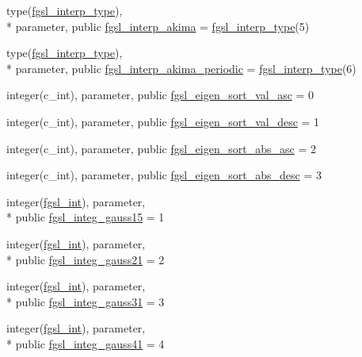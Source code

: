 \begin{DoxyCompactItemize}
\item 
type(\hyperlink{structfgsl_1_1fgsl__interp__type}{fgsl\-\_\-interp\-\_\-type}), \\*
parameter, public \hyperlink{classfgsl_a7da81682e22860ff3f743dcf2e80b6e5}{fgsl\-\_\-interp\-\_\-akima} = \hyperlink{structfgsl_1_1fgsl__interp__type}{fgsl\-\_\-interp\-\_\-type}(5)
\item 
type(\hyperlink{structfgsl_1_1fgsl__interp__type}{fgsl\-\_\-interp\-\_\-type}), \\*
parameter, public \hyperlink{classfgsl_ae51f422b992227f64fb8505b62335502}{fgsl\-\_\-interp\-\_\-akima\-\_\-periodic} = \hyperlink{structfgsl_1_1fgsl__interp__type}{fgsl\-\_\-interp\-\_\-type}(6)
\item 
integer(c\-\_\-int), parameter, public \hyperlink{classfgsl_ad37ba047f5c1bbd5e2621f94d81a5aa4}{fgsl\-\_\-eigen\-\_\-sort\-\_\-val\-\_\-asc} = 0
\item 
integer(c\-\_\-int), parameter, public \hyperlink{classfgsl_a2dac34cd764be6e7de1f57d061c7f5d2}{fgsl\-\_\-eigen\-\_\-sort\-\_\-val\-\_\-desc} = 1
\item 
integer(c\-\_\-int), parameter, public \hyperlink{classfgsl_a5cf81e4e6e4b769e96ca69bea62e2d14}{fgsl\-\_\-eigen\-\_\-sort\-\_\-abs\-\_\-asc} = 2
\item 
integer(c\-\_\-int), parameter, public \hyperlink{classfgsl_a0ed0d4f25aa5ae03cb6adfe004cf648e}{fgsl\-\_\-eigen\-\_\-sort\-\_\-abs\-\_\-desc} = 3
\item 
integer(\hyperlink{classfgsl_a222deda1d7a0c0e845ce4a683318efeb}{fgsl\-\_\-int}), parameter, \\*
public \hyperlink{classfgsl_ae892609677dce6cab285f1a12f956f84}{fgsl\-\_\-integ\-\_\-gauss15} = 1
\item 
integer(\hyperlink{classfgsl_a222deda1d7a0c0e845ce4a683318efeb}{fgsl\-\_\-int}), parameter, \\*
public \hyperlink{classfgsl_a3c4e8f9478c6a8ab3bab6580929c8894}{fgsl\-\_\-integ\-\_\-gauss21} = 2
\item 
integer(\hyperlink{classfgsl_a222deda1d7a0c0e845ce4a683318efeb}{fgsl\-\_\-int}), parameter, \\*
public \hyperlink{classfgsl_a6fd868988f11aa3c2ab7c6a3d60ab1a0}{fgsl\-\_\-integ\-\_\-gauss31} = 3
\item 
integer(\hyperlink{classfgsl_a222deda1d7a0c0e845ce4a683318efeb}{fgsl\-\_\-int}), parameter, \\*
public \hyperlink{classfgsl_a5c219f8f951d411c63849088e0e224da}{fgsl\-\_\-integ\-\_\-gauss41} = 4

\end{DoxyCompactItemize}
